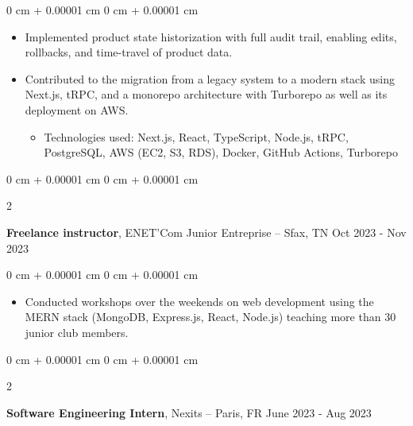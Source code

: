 \documentclass[10pt, letterpaper]{article}
\newenvironment{highlights}{
  \begin{itemize}[
    topsep=0.10 cm,
    parsep=0.10 cm,
    partopsep=0pt,
    itemsep=0pt,
    leftmargin=0 cm + 10pt
    ]
  }{
\end{itemize}
}
\newenvironment{highlightsforbulletentries}{
  \begin{itemize}[
    topsep=0.10 cm,
    parsep=0.10 cm,
    partopsep=0pt,
    itemsep=0pt,
    leftmargin=10pt
    ]
  }{
\end{itemize}
} %
\newenvironment{onecolentry}{
  \begin{adjustwidth}{
      0 cm + 0.00001 cm
    }{
      0 cm + 0.00001 cm
    }
  }{
  \end{adjustwidth}
} %
\newenvironment{twocolentry}[2][]{
  \onecolentry
  \def\secondColumn{#2}
  \setcolumnwidth{\fill, 4.5 cm}
  \begin{paracol}{2}
  }{
    \switchcolumn \raggedleft \secondColumn
  \end{paracol}
  \end{onecolentry}
} %
\begin{document}
  \vspace{0.10 cm}
  \begin{onecolentry}
    \begin{highlights}

    \item Implemented product state historization with full audit trail, enabling edits, rollbacks, and time-travel of product data.

    \item Contributed to the migration from a legacy system to a modern stack using Next.js, tRPC, and a monorepo architecture with Turborepo as well as its deployment on AWS.

                \begin{highlightsforbulletentries}
    \item Technologies used: Next.js, React, TypeScript, Node.js, tRPC, PostgreSQL, AWS (EC2, S3, RDS), Docker, GitHub Actions, Turborepo
    \end{highlightsforbulletentries}


    \end{highlights}

  \end{onecolentry}


    \begin{twocolentry}{
      Oct 2023 - Nov 2023
    }
  \textbf{Freelance instructor}, ENET’Com Junior Entreprise  -- Sfax, TN\end{twocolentry}

  \vspace{0.10 cm}
  \begin{onecolentry}
    \begin{highlights}

    \item Conducted workshops over the weekends on web development using the MERN stack (MongoDB, Express.js, React, Node.js) teaching more than 30 junior club members.


    \end{highlights}

  \end{onecolentry}




  \begin{twocolentry}{
      June 2023 - Aug 2023
    }
  \textbf{Software Engineering Intern}, Nexits  -- Paris, FR\end{twocolentry}

\end{document}
